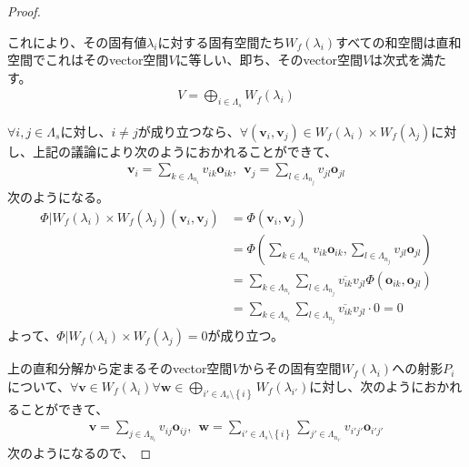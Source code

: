 \documentclass[dvipdfmx]{jsarticle}
\begin{document}
\begin{proof}
\begin{itemize}
\end{itemize}
これにより、その固有値$\lambda_{i}$に対する固有空間たち$W_{f}\left( \lambda_{i} \right)$すべての和空間は直和空間でこれはそのvector空間$V$に等しい、即ち、そのvector空間$V$は次式を満たす。
\begin{align*}
V = \bigoplus_{i \in \varLambda_{s}} {W_{f}\left( \lambda_{i} \right)}
\end{align*}\par
$\forall i,j \in \varLambda_{s}$に対し、$i \neq j$が成り立つなら、$\forall\left( \mathbf{v}_{i},\mathbf{v}_{j} \right) \in W_{f}\left( \lambda_{i} \right) \times W_{f}\left( \lambda_{j} \right)$に対し、上記の議論により次のようにおかれることができて、
\begin{align*}
\mathbf{v}_{i} = \sum_{k \in \varLambda_{n_{i}}} {v_{ik}\mathbf{o}_{ik}},\ \ \mathbf{v}_{j} = \sum_{l \in \varLambda_{n_{j}}} {v_{jl}\mathbf{o}_{jl}}
\end{align*}
次のようになる。
\begin{align*}
\varPhi|W_{f}\left( \lambda_{i} \right) \times W_{f}\left( \lambda_{j} \right)\left( \mathbf{v}_{i},\mathbf{v}_{j} \right) &= \varPhi\left( \mathbf{v}_{i},\mathbf{v}_{j} \right)\\
&= \varPhi\left( \sum_{k \in \varLambda_{n_{i}}} {v_{ik}\mathbf{o}_{ik}},\sum_{l \in \varLambda_{n_{j}}} {v_{jl}\mathbf{o}_{jl}} \right)\\
&= \sum_{k \in \varLambda_{n_{i}}} {\sum_{l \in \varLambda_{n_{j}}} {\overline{v_{ik}}v_{jl}\varPhi\left( \mathbf{o}_{ik},\mathbf{o}_{jl} \right)}}\\
&= \sum_{k \in \varLambda_{n_{i}}} {\sum_{l \in \varLambda_{n_{j}}} {\overline{v_{ik}}v_{jl} \cdot 0}} = 0
\end{align*}
よって、$\varPhi|W_{f}\left( \lambda_{i} \right) \times W_{f}\left( \lambda_{j} \right) = 0$が成り立つ。\par
上の直和分解から定まるそのvector空間$V$からその固有空間$W_{f}\left( \lambda_{i} \right)$への射影$P_{i}$について、$\forall\mathbf{v} \in W_{f}\left( \lambda_{i} \right)\forall\mathbf{w} \in \bigoplus_{i' \in \varLambda_s \setminus \left\{ i \right\}} {W_{f}\left( \lambda_{i'} \right)}$に対し、次のようにおかれることができて、
\begin{align*}
\mathbf{v} = \sum_{j \in \varLambda_{n_{i}}} {v_{ij}\mathbf{o}_{ij}},\ \ \mathbf{w} = \sum_{i' \in \varLambda_s \setminus \left\{ i \right\}} {\sum_{j' \in \varLambda_{n_{i'}}} {v_{i'j'}\mathbf{o}_{i'j'}}}
\end{align*}
次のようになるので、

\end{proof}
\end{document}
